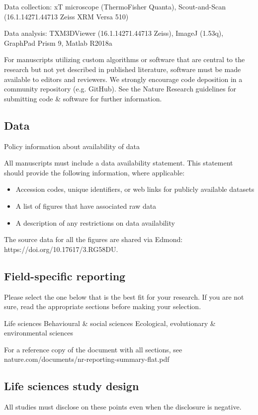 \documentclass{article}
\begin{document}
\noindent Data collection: xT microscope (ThermoFisher Quanta), Scout-and-Scan (16.1.14271.44713 Zeiss XRM Versa 510)

\noindent Data analysis: TXM3DViewer (16.1.14271.44713 Zeiss), ImageJ (1.53q), GraphPad Prism 9, Matlab R2018a

{\small For manuscripts utilizing custom algorithms or software that are central to the research but not yet described in published literature, software must be made available to editors and reviewers. We strongly encourage code deposition in a community repository (e.g. GitHub). See the Nature Research guidelines for submitting code \& software for further information.}

\subsection*{Data}
Policy information about availability of data

All manuscripts must include a data availability statement. This statement should provide the following information, where applicable:
\begin{itemize}
\item[-] Accession codes, unique identifiers, or web links for publicly available datasets
\item[-] A list of figures that have associated raw data
\item[-] A description of any restrictions on data availability
\end{itemize}
\noindent The source data for all the figures are shared via Edmond: https://doi.org/10.17617/3.RG58DU.

\subsection*{Field-specific reporting}
Please select the one below that is the best fit for your research. If you are not sure, read the appropriate sections before making your selection.

\noindent [x] Life sciences \qquad [ ] Behavioural \& social sciences \qquad [ ] Ecological, evolutionary \& environmental sciences

{\small For a reference copy of the document with all sections, see nature.com/documents/nr-reporting-summary-flat.pdf}

\subsection*{Life sciences study design}
All studies must disclose on these points even when the disclosure is negative.
\end{document}
